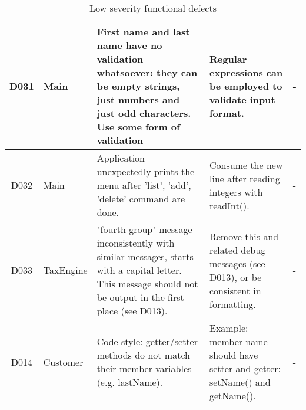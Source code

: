 \begin{table}[H]
\begin{tabularx}{\textwidth}{| c | P | X | X | P |}
\hline %
D031 
& Main 
& First name and last name have no validation whatsoever: they can be empty strings, just numbers and just odd characters. Use some form of validation  
& Regular expressions can be employed to validate input format.  
& -\\
\hline %
D032 
& Main
& Application unexpectedly prints the menu after 'list', 'add', 'delete' command are done.   
& Consume the new line after reading integers with readInt(). 
& -\\
\hline %
D033 
& TaxEngine
& "fourth group" message inconsistently with similar messages, starts with a capital letter. This message should not be output in the first place (see D013). 
& Remove this and related debug messages (see D013), or be consistent in formatting. 
& -\\
\hline %
D014 
& Customer
& Code style: getter/setter methods do not match their member variables (e.g. lastName).
& Example: member name should have setter and getter: setName() and getName().
& -\\
\hline %
\end{tabularx}
\caption{Low severity functional defects}
\end{table}